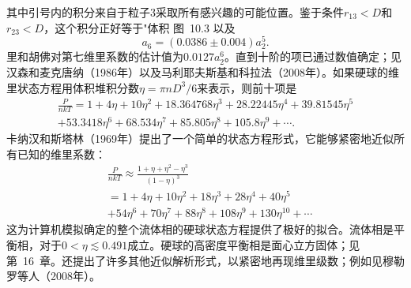 其中引号内的积分来自于粒子3采取所有感兴趣的可能位置。鉴于条件\(r_{13} < D\)和\(r_{23} < D\)，这个积分正好等于"体积
图~10.3
以及
\begin{equation}\tag{10.3.19}\label{eq:10.3.19}
a _ { 6 } = ( 0 . 03 86 \pm 0 . 00 4 ) a _ { 2 } ^{5} .
\end{equation}
里和胡佛对第七维里系数的估计值为\(0.0127a_{2}^{6}\)。直到十阶的项已通过数值确定；见汉森和麦克唐纳（1986年）以及马利耶夫斯基和科拉法（2008年）。如果硬球的维里状态方程用体积堆积分数\(\eta=\pi nD^{3}/6\)来表示，则前十项是
\begin{equation}\tag{10.3.20}\label{eq:10.3.20}
\begin{array}{r} { \frac { P } { n k T } = 1 + 4 \eta + 10 \eta ^{2} + 18 . 36 47 68 \eta ^{3} + 28 . 22 44 5 \eta ^{4} + 39 . 81 54 5 \eta ^{5} } \\{ + 53 . 34 18 \eta ^{6} + 68 . 53 4 \eta ^{7} + 85 . 80 5 \eta ^{8} + 10 5 . 8 \eta ^{9} + \cdots . } \end{array}
\end{equation}
卡纳汉和斯塔林（1969年）提出了一个简单的状态方程形式，它能够紧密地近似所有已知的维里系数：
\begin{equation}\tag{10.3.21}\label{eq:10.3.21}
\begin{array}{rl} & { \frac { P } { n k T } \approx \frac { 1 + \eta + \eta ^{2} - \eta ^{3} } { ( 1 - \eta ) ^{3} } } \\& { = 1 + 4 \eta + 10 \eta ^{2} + 18 \eta ^{3} + 28 \eta ^{4} + 40 \eta ^{5} } \\& {  + 54 \eta ^{6} + 70 \eta ^{7} + 88 \eta ^{8} + 10 8 \eta ^{9} + 13 0 \eta ^{10} + \cdots } \end{array}
\end{equation}
这为计算机模拟确定的整个流体相的硬球状态方程提供了极好的拟合。流体相是平衡相，对于\(0 < \eta \lesssim 0.491\)成立。硬球的高密度平衡相是面心立方固体；见第~16~章。还提出了许多其他近似解析形式，以紧密地再现维里级数；例如见穆勒罗等人（2008年）。
